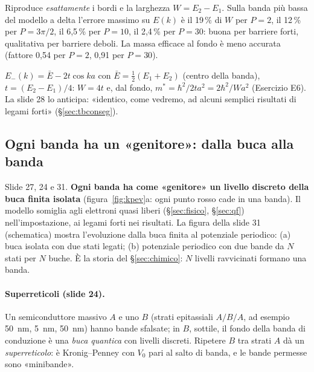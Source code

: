 \documentclass[11pt,a4paper]{article}
\begin{document}
\begin{osservazione}
Riproduce \emph{esattamente} i bordi e la larghezza $W=E_2-E_1$. Sulla banda più bassa del modello a delta l'errore massimo su $E(k)$ è il 19\,\% di $W$ per $P=2$,
il 12\,\% per $P=3\pi/2$, il 6{,}5\,\% per $P=10$, il 2{,}4\,\% per $P=30$: buona per barriere forti, qualitativa per barriere deboli. La massa efficace al fondo è meno accurata (fattore 0{,}54 per $P=2$, 0{,}91 per $P=30$).
\end{osservazione}

\begin{risultato}
$E_-(k)=\bar E-2t\cos ka$ con $\bar E=\tfrac12(E_1+E_2)$ (centro della banda), $t=(E_2-E_1)/4$: $W=4t$ e, dal fondo, $m^*=\hbar^2/2ta^2=2\hbar^2/Wa^2$ (Esercizio E6). La slide 28 lo anticipa:
«identico, come vedremo, ad alcuni semplici risultati di legami forti» (§\ref{sec:tbconseg}).
\end{risultato}

\subsection{Ogni banda ha un «genitore»: dalla buca alla banda}\label{sec:genitore}
Slide 27, 24 e 31. \textbf{Ogni banda ha come «genitore» un livello discreto della buca finita isolata} (figura~\ref{fig:kpev}a: ogni punto rosso cade in una banda). Il modello somiglia agli
elettroni quasi liberi (§\ref{sec:fisico}, §\ref{sec:qf}) nell'impostazione, ai legami forti nei risultati. La figura della slide 31 (schematica) mostra l'evoluzione dalla buca finita al potenziale periodico:
(a) buca isolata con due stati legati; (b) potenziale periodico con due bande da $N$ stati per $N$ buche. È la storia del §\ref{sec:chimico}: $N$ livelli ravvicinati formano una banda.

\paragraph{Superreticoli (slide 24).} Un semiconduttore massivo  $A$ e uno $B$ (strati epitassiali $A/B/A$, ad esempio \SI{50}{nm}, \SI{5}{nm}, \SI{50}{nm}) hanno bande sfalsate; in $B$, sottile, il fondo
della banda di conduzione è una \emph{buca quantica}  con livelli discreti. Ripetere $B$ tra strati $A$ dà un \emph{superreticolo}: è Kronig--Penney con $V_0$ pari al salto di banda, e le bande
permesse sono «minibande».
\end{document}

